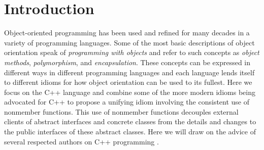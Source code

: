 \documentclass[pdf,ps2pdf,11pt]{SANDreport}
\begin{document}


%
\SANDmain %

%
\section{Introduction}
%

Object-oriented programming has been used and refined for many decades in a
variety of programming languages.  Some of the most basic descriptions of
object orientation speak of {}\textit{programming with objects} and refer to
such concepts as {}\textit{object methods}, {}\textit{polymorphism}, and
{}\textit{encapsulation}.  These concepts can be expressed in different ways
in different programming languages and each language lends itself to different
idioms for how object orientation can be used to its fullest.  Here we focus
on the C++ language and combine some of the more modern idioms being advocated
for C++ to propose a unifying idiom involving the consistent use of nonmember
functions.  This use of nonmember functions decouples external clients of
abstract interfaces and concrete classes from the details and changes to the
public interfaces of these abstract classes.  Here we will draw on the advice
of several respected authors on C++ programming
{}\cite{C++CodingStandards05,EffectiveC++3rd}.
\end{document}
